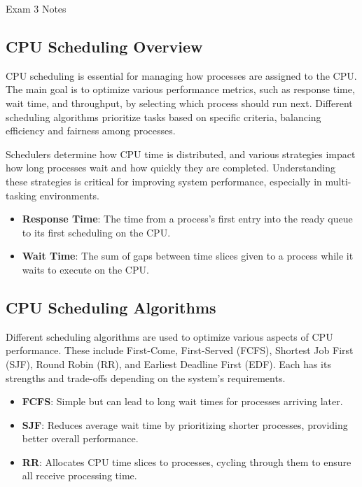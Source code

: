 \begin{examnotes}{Exam 3 Notes}
    \subsection*{CPU Scheduling Overview}

    CPU scheduling is essential for managing how processes are assigned to the CPU. The main goal is to optimize various performance metrics, such as response time, wait time, and throughput, by selecting which process should run next. Different scheduling algorithms prioritize tasks based on specific criteria, balancing efficiency and fairness among processes.
    
    Schedulers determine how CPU time is distributed, and various strategies impact how long processes wait and how quickly they are completed. Understanding these strategies is critical for improving system performance, especially in multi-tasking environments.
    
    \begin{highlight}
        \begin{itemize}
            \item \textbf{Response Time}: The time from a process's first entry into the ready queue to its first scheduling on the CPU.
            \item \textbf{Wait Time}: The sum of gaps between time slices given to a process while it waits to execute on the CPU.
        \end{itemize}
    \end{highlight}
    
    \subsection*{CPU Scheduling Algorithms}
    
    Different scheduling algorithms are used to optimize various aspects of CPU performance. These include First-Come, First-Served (FCFS), Shortest Job First (SJF), Round Robin (RR), and Earliest Deadline First (EDF). Each has its strengths and trade-offs depending on the system's requirements.
    
    \begin{highlight}
        \begin{itemize}
            \item \textbf{FCFS}: Simple but can lead to long wait times for processes arriving later.
            \item \textbf{SJF}: Reduces average wait time by prioritizing shorter processes, providing better overall performance.
            \item \textbf{RR}: Allocates CPU time slices to processes, cycling through them to ensure all receive processing time.
        \end{itemize}
    \end{highlight}
    

\end{examnotes}
